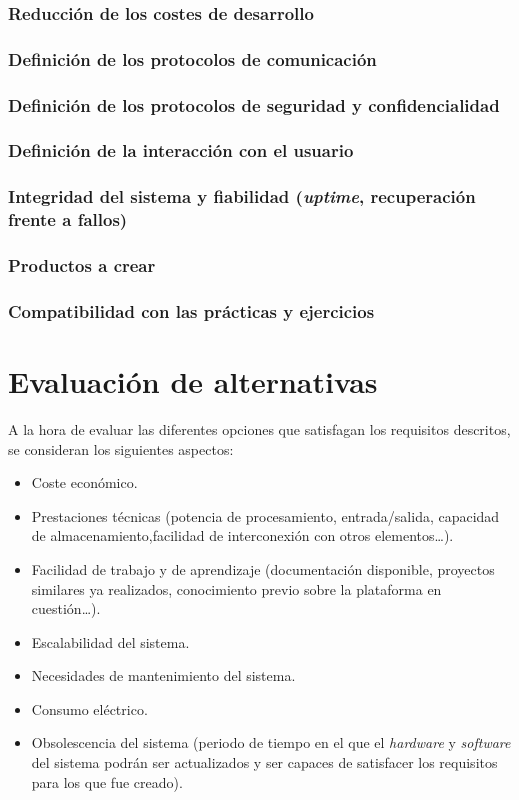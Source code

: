 \subsubsection{Reducción de los costes de desarrollo}
\subsubsection{Definición de los protocolos de comunicación}
\subsubsection{Definición de los protocolos de seguridad y confidencialidad}
\subsubsection{Definición de la interacción con el usuario}
\subsubsection{Integridad del sistema y fiabilidad (\textit{uptime}, recuperación frente a fallos)}
\subsubsection{Productos a crear}
\subsubsection{Compatibilidad con las prácticas y ejercicios}


\section{Evaluación de alternativas}
\label{alternativas}
A la hora de evaluar las diferentes opciones que satisfagan los requisitos descritos, se consideran los siguientes aspectos:

\begin{itemize}
  \item Coste económico.
  \item Prestaciones técnicas (potencia de procesamiento, entrada/salida, capacidad de almacenamiento,facilidad de interconexión con otros elementos\dots).
  \item Facilidad de trabajo y de aprendizaje (documentación disponible, proyectos similares ya realizados, conocimiento previo sobre la plataforma en cuestión\dots).
  \item Escalabilidad del sistema.
  \item Necesidades de mantenimiento del sistema.
  \item Consumo eléctrico.
  \item Obsolescencia del sistema (periodo de tiempo en el que el \textit{hardware} y \textit{software} del sistema podrán ser actualizados y ser capaces de satisfacer los requisitos para los que fue creado).
\end{itemize}

